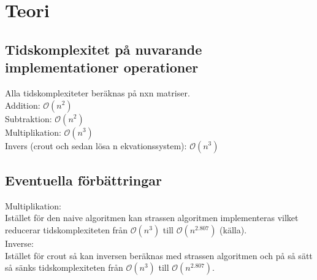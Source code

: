 \section{Teori}
\subsection{Tidskomplexitet på nuvarande implementationer operationer}
Alla tidskomplexiteter beräknas på nxn matriser.\\
Addition: $\mathcal{O}(n^2)$\\
Subtraktion: $\mathcal{O}(n^2)$\\
Multiplikation: $\mathcal{O}(n^3)$\\
Invers (crout och sedan lösa n ekvationssystem): $\mathcal{O}(n^3)$\\ 

\subsection{Eventuella förbättringar}
Multiplikation:\\
Istället för den naive algoritmen kan strassen algoritmen implementeras vilket reducerar tidskomplexiteten från $\mathcal{O}(n^3)$ till $\mathcal{O}(n^2.807)$ (källa). \\
Inverse:\\
Istället för crout så kan inversen beräknas med strassen algoritmen och på så sätt så sänks tidskomplexiteten från $\mathcal{O}(n^3)$ till $\mathcal{O}(n^2.807)$.
